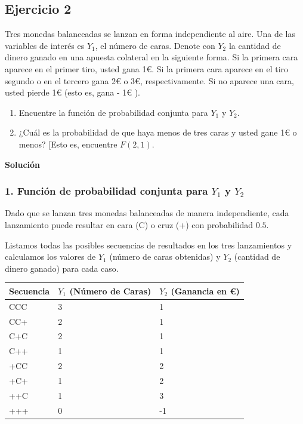 \documentclass[
]{article}
\providecommand{\tightlist}{%
  \setlength{\itemsep}{0pt}\setlength{\parskip}{0pt}}
\begin{document}
\subsection{Ejercicio 2}\label{ejercicio-2}

Tres monedas balanceadas se lanzan en forma independiente al aire. Una de las variables de interés es \(Y_{1}\), el número de caras. Denote con \(Y_{2}\) la cantidad de dinero ganado en una apuesta colateral en la siguiente forma. Si la primera cara aparece en el primer tiro, usted gana 1€. Si la primera cara aparece en el tiro segundo o en el tercero gana 2€ o 3€, respectivamente. Si no aparece una cara, usted pierde 1€ (esto es, gana - 1€ ).

\begin{enumerate}
\def\labelenumi{\arabic{enumi}.}
\tightlist
\item
  Encuentre la función de probabilidad conjunta para \(Y_{1}\) y \(Y_{2}\).
\item
  ¿Cuál es la probabilidad de que haya menos de tres caras y usted gane 1€ o menos? {[}Esto es, encuentre \(F(2,1)\).
\end{enumerate}

\textbf{Solución}

\subsubsection{\texorpdfstring{1. Función de probabilidad conjunta para \(Y_1\) y \(Y_2\)}{1. Función de probabilidad conjunta para Y\_1 y Y\_2}}\label{funciuxf3n-de-probabilidad-conjunta-para-y_1-y-y_2}

Dado que se lanzan tres monedas balanceadas de manera independiente, cada lanzamiento puede resultar en cara (C) o cruz (+) con probabilidad \(0.5\).

Listamos todas las posibles secuencias de resultados en los tres lanzamientos y calculamos los valores de \(Y_1\) (número de caras obtenidas) y \(Y_2\) (cantidad de dinero ganado) para cada caso.

\begin{longtable}[]{@{}lll@{}}
\toprule\noalign{}
Secuencia & \(Y_1\) (Número de Caras) & \(Y_2\) (Ganancia en €) \\
\midrule\noalign{}
\endhead
\bottomrule\noalign{}
\endlastfoot
CCC & 3 & 1 \\
CC+ & 2 & 1 \\
C+C & 2 & 1 \\
C++ & 1 & 1 \\
+CC & 2 & 2 \\
+C+ & 1 & 2 \\
++C & 1 & 3 \\
+++ & 0 & -1 \\
\end{longtable}
\end{document}
